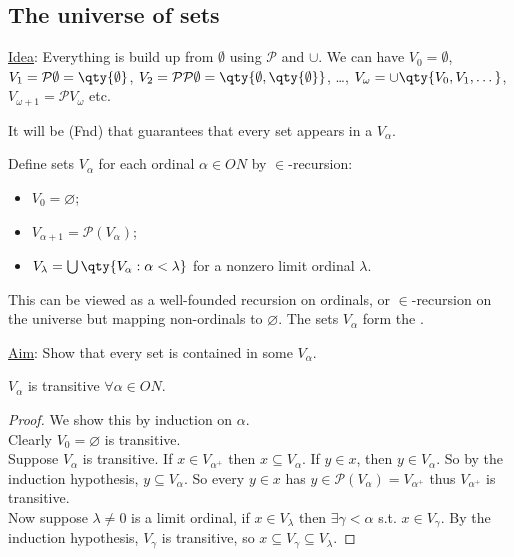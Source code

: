 \subsection{The universe of sets}

\underline{Idea}: Everything is build up from $\emptyset$ using $\mathcal{P}$ and $\cup$.
We can have $V_0 = \emptyset$, $V_1 = \mathcal{P} \emptyset = \qty{\emptyset}$, $V_2 = \mathcal{P} \mathcal{P} \emptyset = \qty{\emptyset, \qty{\emptyset}}$, \dots, $V_\omega = \cup \qty{V_0, V_1, \dots}$, $V_{\omega + 1} = \mathcal{P} V_\omega$ etc.

It will be (Fnd) that guarantees that every set appears in a $V_\alpha$.

Define sets $V_\alpha$ for each ordinal $\alpha \in ON$ by $\in$-recursion:
\begin{itemize}
    \item $V_0 = \varnothing$;
    \item $V_{\alpha+1} = \mathcal P(V_\alpha)$;
    \item $V_\lambda = \bigcup \qty{V_\alpha : \alpha < \lambda}$ for a nonzero limit ordinal $\lambda$.
\end{itemize}
This can be viewed as a well-founded recursion on ordinals, or $\in$-recursion on the universe but mapping non-ordinals to $\varnothing$.
The sets $V_\alpha$ form the .

\underline{Aim}: Show that every set is contained in some $V_\alpha$.

\begin{lemma} \label{lem:5-6}
    $V_\alpha$ is transitive $\forall \alpha \in ON$.
\end{lemma}

\begin{proof}
    We show this by induction on $\alpha$. \\
    Clearly $V_0 = \varnothing$ is transitive. \\
    Suppose $V_\alpha$ is transitive.
    If $x \in V_{\alpha^+}$ then $x \subseteq V_\alpha$.
    If $y \in x$, then $y \in V_\alpha$.
    So by the induction hypothesis, $y \subseteq V_\alpha$.
    So every $y \in x$ has $y \in \mathcal{P}(V_\alpha) = V_{\alpha^+}$ thus $V_{\alpha^+}$ is transitive. \\
    Now suppose $\lambda \neq 0$ is a limit ordinal, if $x \in V_\lambda$ then $\exists \gamma < \alpha$ s.t. $x \in V_\gamma$.
    By the induction hypothesis, $V_\gamma$ is transitive, so $x \subseteq V_\gamma \subseteq V_\lambda$.
\end{proof}

